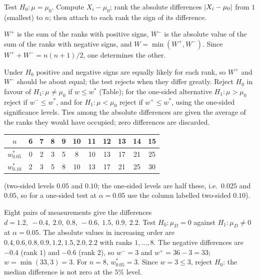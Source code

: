 Test $H_0:\mu=\mu_0$. Compute $X_i-\mu_0$; rank the absolute differences $\lvert X_i-\mu_0\rvert$ from $1$ (smallest) to $n$; then attach to each rank the sign of its difference.

\begin{definition}
$W^+$ is the sum of the ranks with positive signs, $W^-$ is the absolute value of the sum of the ranks with negative signs, and $W=\min(W^+,W^-)$. Since $W^++W^-=n(n+1)/2$, one determines the other.
\end{definition}

Under $H_0$ positive and negative signs are equally likely for each rank, so $W^+$ and $W^-$ should be about equal; the test rejects when they differ greatly. Reject $H_0$ in favour of $H_1:\mu\ne\mu_0$ if $w\le w^*$ (Table); for the one-sided alternative $H_1:\mu>\mu_0$ reject if $w^-\le w^*$, and for $H_1:\mu<\mu_0$ reject if $w^+\le w^*$, using the one-sided significance levels. Ties among the absolute differences are given the average of the ranks they would have occupied; zero differences are discarded.

\begin{center}
\small
\begin{tabular}{c|cccccccccc}
\toprule
$n$ & 6 & 7 & 8 & 9 & 10 & 11 & 12 & 13 & 14 & 15\\
\midrule
$w^*_{0.05}$ & 0 & 2 & 3 & 5 & 8 & 10 & 13 & 17 & 21 & 25\\
$w^*_{0.10}$ & 2 & 3 & 5 & 8 & 10 & 13 & 17 & 21 & 25 & 30\\
\bottomrule
\end{tabular}
\end{center}
(two-sided levels $0.05$ and $0.10$; the one-sided levels are half these, i.e.\ $0.025$ and $0.05$, so for a one-sided test at $\alpha=0.05$ use the column labelled two-sided $0.10$).

\begin{example}\label{ex:wilcoxon}
Eight pairs of measurements give the differences $d=1.2,\ -0.4,\ 2.0,\ 0.8,\ -0.6,\ 1.5,\ 0.9,\ 2.2$. Test $H_0:\mu_D=0$ against $H_1:\mu_D\ne0$ at $\alpha=0.05$. The absolute values in increasing order are $0.4,0.6,0.8,0.9,1.2,1.5,2.0,2.2$ with ranks $1,\dots,8$. The negative differences are $-0.4$ (rank $1$) and $-0.6$ (rank $2$), so $w^-=3$ and $w^+=36-3=33$; $w=\min(33,3)=3$. For $n=8$, $w^*_{0.05}=3$. Since $w=3\le3$, reject $H_0$: the median difference is not zero at the $5\%$ level.
\end{example}

